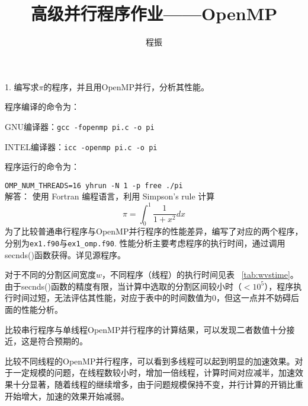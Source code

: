\documentclass{ctexart}
\author{程振}
\title{高级并行程序作业——OpenMP}
\begin{document}
\maketitle

1. 编写求$\pi$的程序，并且用OpenMP并行，分析其性能。

程序编译的命令为：

\qquad GNU编译器：\lstinline {gcc -fopenmp pi.c -o pi}

\qquad INTEL编译器：\lstinline {icc -openmp pi.c -o pi}

程序运行的命令为：

\qquad \lstinline {OMP_NUM_THREADS=16 yhrun -N 1 -p free ./pi}
\\

{\heiti 解答：}
使用 Fortran 编程语言，利用 Simpson's rule 计算
\lstset{language=C}
\begin{equation}
     \pi= \int_0^1 \frac{1}{1+x^2} dx
\end{equation}
\qquad 为了比较普通串行程序与OpenMP并行程序的性能差异，编写了对应的两个程序，分别为\lstinline{ex1.f90}与\lstinline{ex1_omp.f90}.
性能分析主要考虑程序的执行时间，通过调用secnds()函数获得。详见源程序。

\qquad 对于不同的分割区间宽度$w$，不同程序（线程）的执行时间见表 ~\ref{tab:wvstime}。由于secnds()函数的精度有限，当计算中选取的分割区间较小时（$<10^5$），程序执行时间过短，无法评估其性能，对应于表中的时间数值为0，但这一点并不妨碍后面的性能分析。

\qquad 比较串行程序与单线程OpenMP并行程序的计算结果，可以发现二者数值十分接近，这是符合预期的。

\qquad 比较不同线程的OpenMP并行程序，可以看到多线程可以起到明显的加速效果。对于一定规模的问题，在线程数较小时，增加一倍线程，计算时间对应减半，加速效果十分显著，随着线程的继续增多，由于问题规模保持不变，并行计算的开销比重开始增大，加速的效果开始减弱。
\\
\end{document}
